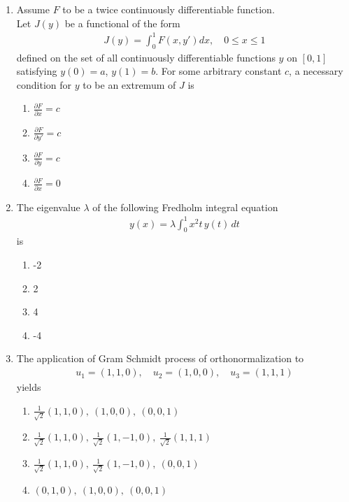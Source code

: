 \documentclass[journal]{IEEEtran}
\numberwithin{equation}{enumi}
\numberwithin{figure}{enumi}
\begin{document}
\begin{enumerate}
\item Assume $F$ to be a twice continuously differentiable function.\\
Let $J(y)$ be a functional of the form  \hfill{}
\begin{align*}
J(y) = \int_0^1 F(x, y') dx, \quad 0 \leq x \leq 1
\end{align*}
defined on the set of all continuously differentiable functions $y$ on $[0,1]$ satisfying $y(0) = a$, $y(1) = b$. For some arbitrary constant $c$, a necessary condition for $y$ to be an extremum of $J$ is
\begin{multicols}{4}
\begin{enumerate}
    \item $\frac{\partial F}{\partial x} = c$ \hspace{1cm}
    \item $\frac{\partial F}{\partial y'} = c$ \hspace{1cm}
    \item $\frac{\partial F}{\partial y} = c$ \hspace{1cm}
    \item $\frac{\partial F}{\partial x} = 0$
\end{enumerate}
\end{multicols}


\item The eigenvalue $\lambda$ of the following Fredholm integral equation
\begin{align*}
y(x) = \lambda \int_{0}^{1} x^{2} t \, y(t) \, dt
\end{align*}
is
\hfill{}
\begin{multicols}{4}
\begin{enumerate}
    \item -2
    \item 2
    \item 4
    \item -4
\end{enumerate}
\end{multicols}



\item The application of Gram Schmidt process of orthonormalization to 
\begin{align*}
u_1 = (1,1,0), \quad u_2 = (1,0,0), \quad u_3 = (1,1,1)
\end{align*}
yields
\hfill{}
\begin{multicols}{2}
\begin{enumerate}
    \item $\frac{1}{\sqrt{2}}(1,1,0),\ (1,0,0),\ (0,0,1)$
    \item $\frac{1}{\sqrt{2}}(1,1,0),\ \frac{1}{\sqrt{2}}(1,-1,0),\ \frac{1}{\sqrt{2}}(1,1,1)$
    \item  $\frac{1}{\sqrt{2}}(1,1,0),\ \frac{1}{\sqrt{2}}(1,-1,0),\ (0,0,1)$
    \item  $(0,1,0),\ (1,0,0),\ (0,0,1)$
\end{enumerate}
\end{multicols}




\end{enumerate}
\end{document}
